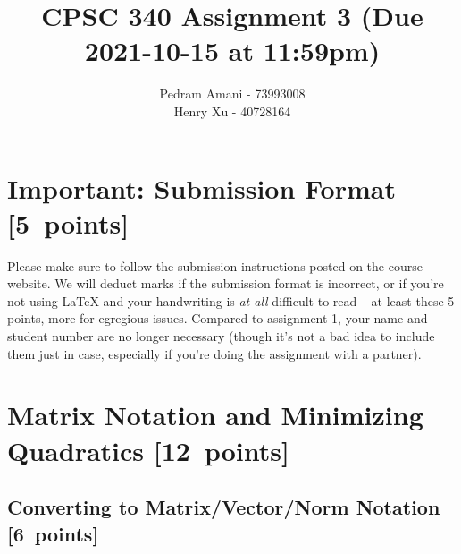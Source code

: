 \documentclass{article}
\newcommand{\blu}[1]{{\textcolor{blu}{#1}}}
\let\ask\blu
\newcommand\pts[1]{\textcolor{pointscolour}{[#1~points]}}
\begin{document}
\title{CPSC 340 Assignment 3 (Due 2021-10-15 at 11:59pm)}
\author{
        Pedram Amani - 73993008\\
        Henry Xu - 40728164
    }
\date{}
\maketitle


\vspace{-4em}



\section*{Important: Submission Format \pts{5}}

    Please make sure to follow the submission instructions posted on the course website.
    \ask{We will deduct marks if the submission format is incorrect, or if you're not using \LaTeX{} and your handwriting is \emph{at all} difficult to read} -- at least these 5 points, more for egregious issues.
    Compared to assignment 1, your name and student number are no longer necessary (though it's not a bad idea to include them just in case, especially if you're doing the assignment with a partner).


\section{Matrix Notation and Minimizing Quadratics \pts{12}}


\subsection{Converting to Matrix/Vector/Norm Notation \pts{6}}
\end{document}
